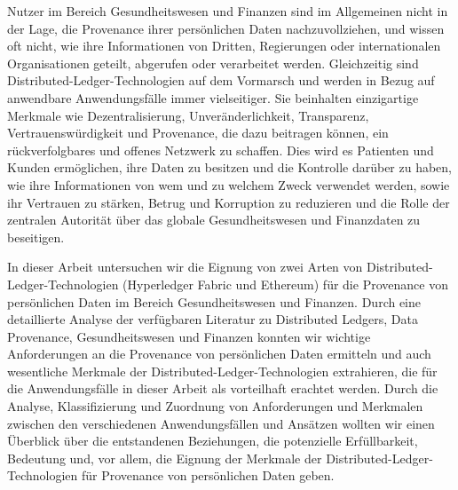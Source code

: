 
\Abstract
Nutzer im Bereich Gesundheitswesen und Finanzen sind im Allgemeinen nicht in der Lage, die Provenance ihrer persönlichen Daten nachzuvollziehen, und wissen oft nicht, wie ihre Informationen von Dritten, Regierungen oder internationalen Organisationen geteilt, abgerufen oder verarbeitet werden. Gleichzeitig sind Distributed-Ledger-Technologien auf dem Vormarsch und werden in Bezug auf anwendbare Anwendungsfälle immer vielseitiger. Sie beinhalten einzigartige Merkmale wie Dezentralisierung, Unveränderlichkeit, Transparenz, Vertrauenswürdigkeit und Provenance, die dazu beitragen können, ein rückverfolgbares und offenes Netzwerk zu schaffen. Dies wird es Patienten und Kunden ermöglichen, ihre Daten zu besitzen und die Kontrolle darüber zu haben, wie ihre Informationen von wem und zu welchem Zweck verwendet werden, sowie ihr Vertrauen zu stärken, Betrug und Korruption zu reduzieren und die Rolle der zentralen Autorität über das globale Gesundheitswesen und Finanzdaten zu beseitigen.

In dieser Arbeit untersuchen wir die Eignung von zwei Arten von Distributed-Ledger-Technologien (Hyperledger Fabric und Ethereum) für die Provenance von persönlichen Daten im Bereich Gesundheitswesen und Finanzen. Durch eine detaillierte Analyse der verfügbaren Literatur zu Distributed Ledgers, Data Provenance, Gesundheitswesen und Finanzen konnten wir wichtige Anforderungen an die Provenance von persönlichen Daten ermitteln und auch wesentliche Merkmale der Distributed-Ledger-Technologien extrahieren, die für die Anwendungsfälle in dieser Arbeit als vorteilhaft erachtet werden. Durch die Analyse, Klassifizierung und Zuordnung von Anforderungen und Merkmalen zwischen den verschiedenen Anwendungsfällen und Ansätzen wollten wir einen Überblick über die entstandenen Beziehungen, die potenzielle Erfüllbarkeit, Bedeutung und, vor allem, die Eignung der Merkmale der Distributed-Ledger-Technologien für Provenance von persönlichen Daten geben.

